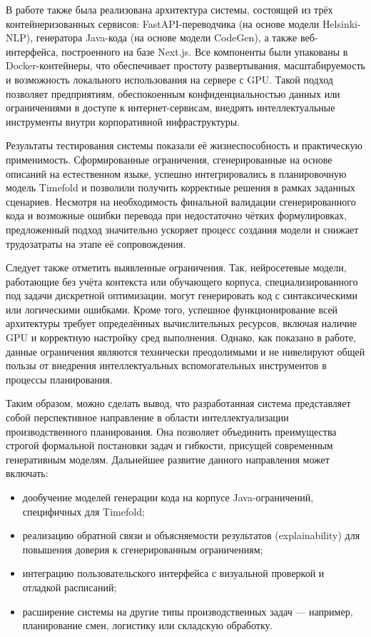 В работе также была реализована архитектура системы, состоящей из трёх контейнеризованных сервисов: FastAPI-переводчика (на основе модели Helsinki-NLP), генератора Java-кода (на основе модели CodeGen), а также веб-интерфейса, построенного на базе Next.js. Все компоненты были упакованы в Docker-контейнеры, что обеспечивает простоту развертывания, масштабируемость и возможность локального использования на сервере с GPU. Такой подход позволяет предприятиям, обеспокоенным конфиденциальностью данных или ограничениями в доступе к интернет-сервисам, внедрять интеллектуальные инструменты внутри корпоративной инфраструктуры.

Результаты тестирования системы показали её жизнеспособность и практическую применимость. Сформированные ограничения, сгенерированные на основе описаний на естественном языке, успешно интегрировались в планировочную модель Timefold и позволили получить корректные решения в рамках заданных сценариев. Несмотря на необходимость финальной валидации сгенерированного кода и возможные ошибки перевода при недостаточно чётких формулировках, предложенный подход значительно ускоряет процесс создания модели и снижает трудозатраты на этапе её сопровождения.

Следует также отметить выявленные ограничения. Так, нейросетевые модели, работающие без учёта контекста или обучающего корпуса, специализированного под задачи дискретной оптимизации, могут генерировать код с синтаксическими или логическими ошибками. Кроме того, успешное функционирование всей архитектуры требует определённых вычислительных ресурсов, включая наличие GPU и корректную настройку сред выполнения. Однако, как показано в работе, данные ограничения являются технически преодолимыми и не нивелируют общей пользы от внедрения интеллектуальных вспомогательных инструментов в процессы планирования.

Таким образом, можно сделать вывод, что разработанная система представляет собой перспективное направление в области интеллектуализации производственного планирования. Она позволяет объединить преимущества строгой формальной постановки задач и гибкости, присущей современным генеративным моделям. Дальнейшее развитие данного направления может включать:
\begin{itemize}
    \item дообучение моделей генерации кода на корпусе Java-ограничений, специфичных для Timefold;
    \item реализацию обратной связи и объясняемости результатов (explainability) для повышения доверия к сгенерированным ограничениям;
    \item интеграцию пользовательского интерфейса с визуальной проверкой и отладкой расписаний;
    \item расширение системы на другие типы производственных задач — например, планирование смен, логистику или складскую обработку.
\end{itemize}

